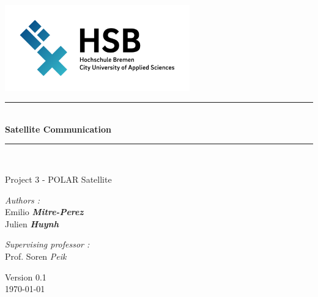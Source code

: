 \documentclass[a4paper,12pt,calibri,oneside,openany]{book}
\theoremstyle{break}
\begin{document}
\renewcommand{\bibname}{Bibliographie et Webographie}

\begin{titlepage}
\begin{center}

\includegraphics[width=0.6\textwidth]{logohsb}\\[1cm]



\rule{\linewidth}{0.5mm} \\[0.4cm]
{ \huge \bfseries Satellite Communication\\[0.4cm] }
\rule{\linewidth}{0.5mm} \\[1.cm]
\begin{center}
		Project 3 - POLAR Satellite
\end{center}
\noindent
\begin{minipage}{0.4\textwidth}
  \begin{flushleft} \large
    \emph{Authors :}\\
    Emilio \textbf{\textit{Mitre-Perez}}\\
    Julien \textbf{\textit{Huynh}}\
  \end{flushleft}
\end{minipage}%
\begin{minipage}{0.4\textwidth}
  \begin{flushright} \large
    \emph{Supervising professor :} \\
    Prof. Soren \textit{Peik}\\
  \end{flushright}
\end{minipage}

\vfill

{\large Version 0.1\\ \today}

\end{center}
\end{titlepage}
\end{document}
